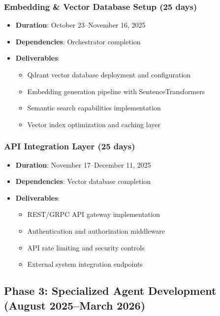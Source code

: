 \documentclass[12pt]{report}
\begin{document}
\subsubsection{Embedding \& Vector Database Setup (25 days)}
\begin{itemize}
  \item \textbf{Duration}: October 23--November 16, 2025
  \item \textbf{Dependencies}: Orchestrator completion
  \item \textbf{Deliverables}:
    \begin{itemize}
      \item Qdrant vector database deployment and configuration
      \item Embedding generation pipeline with SentenceTransformers
      \item Semantic search capabilities implementation
      \item Vector index optimization and caching layer
    \end{itemize}
\end{itemize}

\subsubsection{API Integration Layer (25 days)}
\begin{itemize}
  \item \textbf{Duration}: November 17--December 11, 2025
  \item \textbf{Dependencies}: Vector database completion
  \item \textbf{Deliverables}:
    \begin{itemize}
      \item REST/GRPC API gateway implementation
      \item Authentication and authorization middleware
      \item API rate limiting and security controls
      \item External system integration endpoints
    \end{itemize}
\end{itemize}

\subsection{Phase 3: Specialized Agent Development (August 2025--March 2026)}
\end{document}
